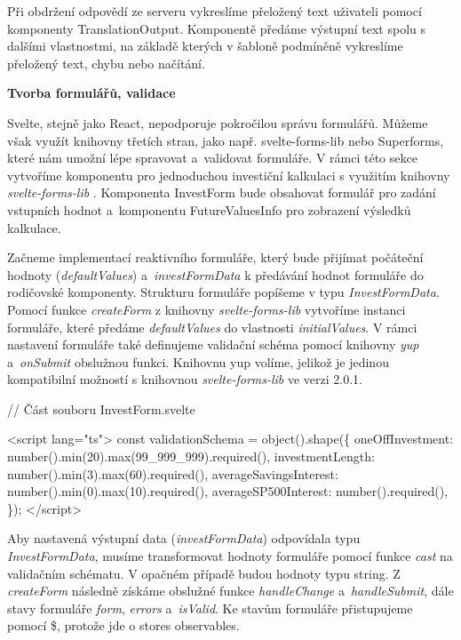 Při obdržení odpovědí ze serveru vykreslíme přeložený text uživateli pomocí komponenty TranslationOutput. 
Komponentě předáme výstupní text spolu s dalšími vlastnostmi, na základě kterých v šabloně podmíněně vykreslíme přeložený text, chybu nebo načítání.

\begin{flushleft}
  \textbf{Tvorba formulářů, validace}
\end{flushleft}

Svelte, stejně jako React, nepodporuje pokročilou správu formulářů. Můžeme však využít knihovny třetích stran, jako např. svelte-forms-lib nebo Superforms, které nám umožní lépe spravovat a~validovat formuláře. 
V rámci této sekce vytvoříme komponentu pro jednoduchou investiční kalkulaci s využitím knihovny \emph{svelte-forms-lib} \cite{svelteformslib}. 
Komponenta InvestForm bude obsahovat formulář pro zadání vstupních hodnot a~komponentu FutureValuesInfo pro zobrazení výsledků kalkulace.

Začneme implementací reaktivního formuláře, který bude přijímat počáteční hodnoty (\emph{defaultValues}) a~\emph{investFormData} k předávání hodnot formuláře do rodičovské komponenty. 
Strukturu formuláře popíšeme v typu \emph{InvestFormData}. Pomocí funkce \emph{createForm} z knihovny \emph{svelte-forms-lib} vytvoříme instanci formuláře, které předáme \emph{defaultValues} do vlastnosti \emph{initialValues}. 
V rámci nastavení formuláře také definujeme validační schéma pomocí knihovny \emph{yup} \cite{yuplibrary} a~\emph{onSubmit} obslužnou funkci. 
Knihovnu yup volíme, jelikož je jedinou kompatibilní možností s knihovnou \emph{svelte-forms-lib} ve verzi 2.0.1. 

\begin{prog}
// Část souboru InvestForm.svelte

<script lang="ts">
  const validationSchema = object().shape(\{
    oneOffInvestment: number().min(20).max(99_999_999).required(),
    investmentLength: number().min(3).max(60).required(),
    averageSavingsInterest: number().min(0).max(10).required(),
    averageSP500Interest: number().required(),
  \});
</script>
\end{prog}

Aby nastavená výstupní data (\emph{investFormData}) odpovídala typu \emph{InvestFormData}, musíme transformovat hodnoty formuláře pomocí funkce \emph{cast} na validačním schématu. V opačném případě budou hodnoty typu string. 
Z \emph{createForm} následně získáme obslužné funkce \emph{handleChange} a~\emph{handleSubmit}, dále stavy formuláře \emph{form}, \emph{errors} a~\emph{isValid}. Ke stavům formuláře přistupujeme pomocí \$, protože jde o stores observables.

